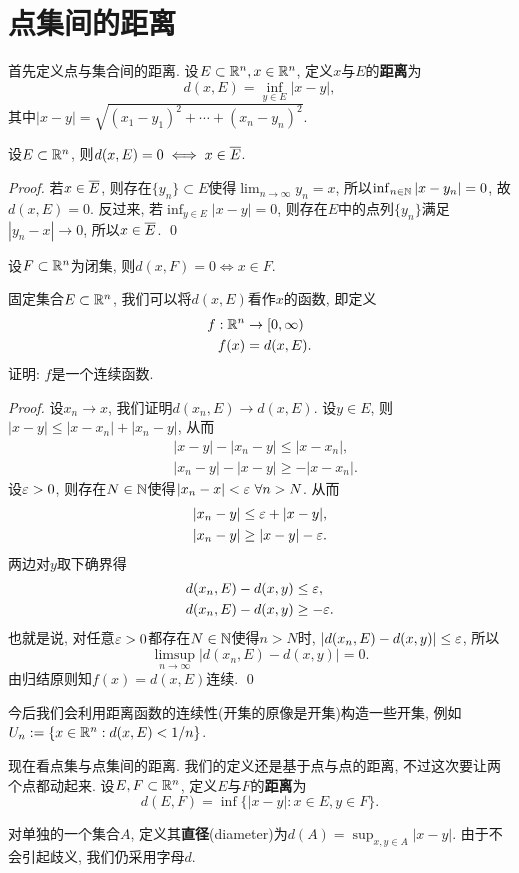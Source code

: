 \section{点集间的距离}
首先定义点与集合间的距离. 设$E \subset \mathbb{R}^n, x \in \mathbb{R}^n$, 定义$x$与$E$的\textbf{距离}为
$$d(x,E) = \inf_{y \in E} |x-y|, $$
其中$|x-y| = \sqrt{(x_1-y_1)^2 + \cdots + (x_n-y_n)^2}$.
\begin{example}
    设$E \subset \mathbb{R}^n$, 则$d(x,E) = 0 \iff x \in \overline{E}$. 
\end{example}
\begin{proof}
    若$x \in \overline{E}$, 则存在$\{y_n\} \subset E$使得$\lim_{n \to \infty}y_n = x$, 所以$\inf_{n \in \mathbb{N}}|x-y_n| = 0$, 故$d(x,E) = 0$. 反过来, 若$\inf_{y \in E}|x-y| = 0$, 则存在$E$中的点列$\{y_n\}$满足$|y_n - x| \to 0$, 所以$x \in \overline{E}$. \qed 
\end{proof}
\begin{exercise}
    设$F \subset \mathbb{R}^n$为闭集, 则$d(x,F) = 0 \iff x \in F$.
\end{exercise}
\begin{example}
    固定集合$E \subset \mathbb{R}^n$, 我们可以将$d(x,E)$看作$x$的函数, 即定义
    \begin{align*}
        f: \mathbb{R}^n &\to [0,\infty) \\
        f(x) &= d(x,E).
    \end{align*}
    证明: $f$是一个连续函数. 
\end{example}
\begin{proof}
    设$x_n \to x$, 我们证明$d(x_n,E) \to d(x,E)$. 设$y \in E$, 则$|x-y| \leq |x-x_n| + |x_n-y|$, 从而
    \begin{align*}
        &|x-y|-|x_n-y| \leq |x-x_n|, \\
        &|x_n-y| - |x-y| \geq -|x-x_n|.
    \end{align*}
    设$\varepsilon>0$, 则存在$N \in \mathbb{N}$使得$|x_n - x|<\varepsilon~\forall n > N$. 从而
    \begin{align*}
        &|x_n-y| \leq \varepsilon + |x-y|, \\
        &|x_n-y| \geq |x-y|-\varepsilon.
    \end{align*}
    两边对$y$取下确界得
    \begin{align*}
        &d(x_n,E)-d(x,y) \leq \varepsilon, \\
        &d(x_n,E)-d(x,y) \geq -\varepsilon.
    \end{align*}
    也就是说, 对任意$\varepsilon>0$都存在$N\in\mathbb{N}$使得$n>N$时, $|d(x_n,E)-d(x,y)| \leq \varepsilon$, 所以
    $$\limsup_{n\to \infty}|d(x_n,E)-d(x,y)|=0. $$
    由归结原则知$f(x)=d(x,E)$连续. \qed    
\end{proof}
今后我们会利用距离函数的连续性(开集的原像是开集)构造一些开集, 例如$U_n := \{x \in \mathbb{R}^n: d(x,E) < 1/n\}$.

现在看点集与点集间的距离. 我们的定义还是基于点与点的距离, 不过这次要让两个点都动起来. 设$E,F \subset \mathbb{R}^n$, 定义$E$与$F$的\textbf{距离}为
$$d(E,F) = \inf\{|x-y|: x \in E, y \in F\}.$$

对单独的一个集合$A$, 定义其\textbf{直径}(diameter)为$d(A) = \sup_{x,y \in A} |x-y|$. 由于不会引起歧义, 我们仍采用字母$d$. 